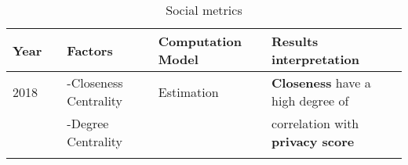 \begin{longtable}{lllll}
	\textbf{Year}  &                                                & \textbf{Factors}                 & \textbf{Computation Model}       & \textbf{Results interpretation}                               \\\hline
	2018  		   & \cite{alemany_estimation_2018}                 & -Closeness Centrality            & Estimation                       & \textbf{Closeness} have a high degree of                      \\
	\    		   &                                                & -Degree Centrality               &                                  & correlation with \textbf{privacy score}                       \\\hline
\caption{Social metrics}
\end{longtable}
